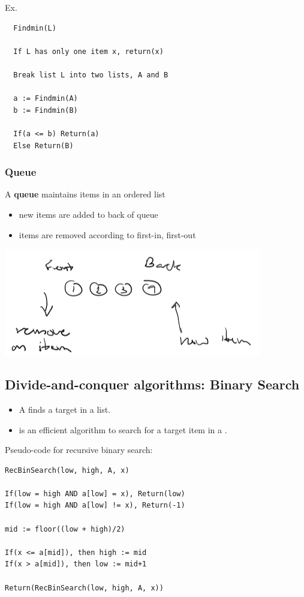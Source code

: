 Ex.
\begin{lstlisting}
  Findmin(L)

  If L has only one item x, return(x)

  Break list L into two lists, A and B

  a := Findmin(A)
  b := Findmin(B)

  If(a <= b) Return(a)
  Else Return(B)
\end{lstlisting}

\subsubsection*{Queue}
A \textbf{queue} maintains items in an ordered list
\begin{itemize}
  \item new items are added to back of queue
  \item items are removed according to first-in, first-out
\end{itemize}
\begin{center}
  \includegraphics[width=.6\linewidth]{resources/queue.png}
\end{center}

\subsection{Divide-and-conquer algorithms: Binary Search}
\begin{itemize}
  \item A  finds a target in a list.
  \item {} is an efficient algorithm to search for a target item in a .
\end{itemize}
{\large Pseudo-code for recursive binary search:}
\begin{lstlisting}
RecBinSearch(low, high, A, x)

If(low = high AND a[low] = x), Return(low)
If(low = high AND a[low] != x), Return(-1)

mid := floor((low + high)/2)

If(x <= a[mid]), then high := mid
If(x > a[mid]), then low := mid+1

Return(RecBinSearch(low, high, A, x))
\end{lstlisting}

